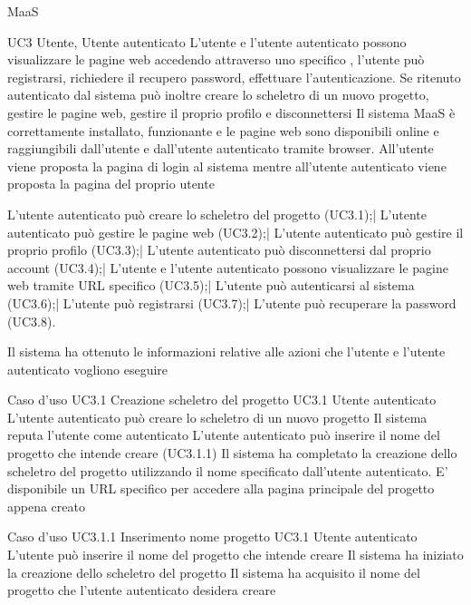 
{MaaS}

\UC
{UC3}
{Utente, Utente autenticato}
{L'utente e l'utente autenticato possono visualizzare le pagine web accedendo attraverso uno specifico , l'utente può registrarsi, richiedere il recupero password, effettuare l'autenticazione. Se ritenuto autenticato dal sistema può inoltre creare lo scheletro di un nuovo progetto, gestire le pagine web, gestire il proprio profilo e disconnettersi}
{Il sistema MaaS è correttamente installato, funzionante e le pagine web sono disponibili online e raggiungibili dall'utente e dall'utente autenticato tramite browser. All'utente viene proposta la pagina di login al sistema mentre all'utente autenticato viene proposta la pagina del proprio  utente}

\scenario
{L'utente autenticato può creare lo scheletro del progetto (UC3.1);|
L'utente autenticato può  gestire le pagine web (UC3.2);|
L'utente autenticato può  gestire il proprio profilo (UC3.3);|
L'utente autenticato può  disconnettersi dal proprio account (UC3.4);|
L'utente e l'utente autenticato possono visualizzare le pagine web tramite URL specifico (UC3.5);|
L'utente può autenticarsi al sistema (UC3.6);|
L'utente può registrarsi (UC3.7);|
L'utente può recuperare la password (UC3.8).
}

\post
{Il sistema ha ottenuto le informazioni relative alle azioni che l'utente e l'utente autenticato vogliono eseguire}


\UCtitle
{Caso d'uso UC3.1}
{Creazione scheletro del progetto}
\UC
{UC3.1}
{Utente autenticato}
{L'utente autenticato può creare lo scheletro di un nuovo progetto}
{Il sistema reputa l'utente come autenticato}
\scenario
{L'utente autenticato può inserire il nome del progetto che intende creare (UC3.1.1)}
\post
{Il sistema ha completato la creazione dello scheletro del progetto utilizzando il nome specificato dall'utente autenticato. E' disponibile un URL specifico per accedere alla pagina principale del progetto appena creato}

\UCtitle
{Caso d'uso UC3.1.1}
{Inserimento nome progetto}
\UC
{UC3.1}
{Utente autenticato}
{L'utente può inserire il nome del progetto che intende creare}
{Il sistema ha iniziato la creazione dello scheletro del progetto}
\post
{Il sistema ha acquisito il nome del progetto che l'utente autenticato desidera creare}

